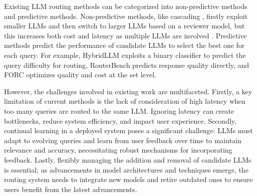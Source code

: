 Existing LLM routing methods can be categorized into non-predictive methods and predictive methods. Non-predictive methods, like cascading \cite{chen2023frugalgpt,madaan2023automix}, firstly exploit smaller LLMs and then switch to larger LLMs based on a reviewer model, but this increases both cost and latency as multiple LLMs are involved \cite{tay2022ul2}.
Predictive methods predict the performance of candidate LLMs to select the best one for each query.
For example, HybridLLM \cite{ding2024hybrid} exploits a binary classifier to predict the query difficulty for routing, 
RouterBench \cite{hu2024routerbench} predicts response quality directly, and FORC \cite{vsakota2024fly} optimizes quality and cost at the set level.

However, the challenges involved in existing work are multifaceted. 
Firstly, a key limitation of current methods is the lack of consideration 
of high latency when too many queries are routed to the same LLM. Ignoring latency can create bottlenecks, reduce system efficiency, and impact user experience. 
Secondly, continual learning in a deployed system poses a significant challenge: LLMs must adapt to evolving queries and learn from user feedback over time to maintain relevance and accuracy, necessitating robust mechanisms for incorporating feedback.
Lastly, flexibly managing the addition and removal of candidate LLMs is essential; as advancements in model architectures and techniques emerge, the routing system needs to integrate new models and retire outdated ones to ensure users benefit from the latest advancements.



